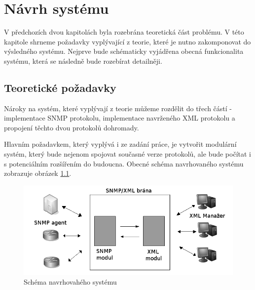 \chapter{Návrh systému}
\label{kap_navrh_systemu}
V předchozích dvou kapitolách byla rozebrána teoretická část problému. V této kapitole shrneme požadavky vyplývající z teorie, které je nutno zakomponovat do
výsledného systému. Nejprve bude schématicky vyjádřena obecná funkcionalita systému, která se následně bude rozebírat detailněji.

\section{Teoretické požadavky}
Nároky na systém, které vyplývají z teorie můžeme rozdělit do třech částí - implementace SNMP protokolu, implementace navrženého XML protokolu a propojení těchto dvou protokolů dohromady.

Hlavním požadavkem, který vyplývá i ze zadání práce, je vytvořit modulární systém, který bude nejenom spojovat současné verze protokolů, ale bude počítat i s potenciálním rozšířením do
budoucna. Obecné schéma navrhovaného systému zobrazuje obrázek \ref{obr_an_obecne_schema}. 

\begin{figure}[htp]
	\begin{center}
		\includegraphics[width=15cm]{obrazky/04_obecne_schema.png}
		\caption{Schéma navrhovahého systému}
		\label{obr_an_obecne_schema}
	\end{center}
\end{figure}

